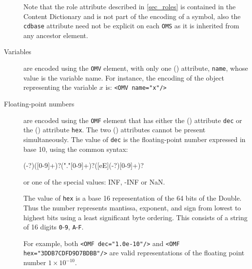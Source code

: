 \begin{description}
  Note that the role attribute described in \ref{sec_roles} is contained in the Content
  Dictionary and is not part of the encoding of a symbol, also the \lstinline|cdbase|
  attribute need not be explicit on each \lstinline|OMS| as it is inherited from any
  ancestor element.
\item[Variables] are encoded using the \lstinline|OMV| element, with only one (\XML)
  attribute, \lstinline|name|, whose value is the variable name. For instance, the
  encoding of the object representing the variable $x$ is: \lstinline|<OMV name="x"/>|
\item[Floating-point numbers] are encoded using the \lstinline|OMF| element that has
  either the (\XML) attribute \lstinline|dec| or the (\XML) attribute \lstinline|hex|. The
  two (\XML) attributes cannot be present simultaneously. The value of \lstinline|dec| is
  the floating-point number expressed in base 10, using the common syntax:

\begin{lstinline}
(-?)([0-9]+)?("."[0-9]+)?([eE](-?)[0-9]+)?
\end{lstinline}

or one of the special values: INF, -INF or NaN.

The value of \lstinline|hex| is a base 16 representation of the 64 bits of the
 Double.  Thus the number represents mantissa, exponent, and sign from
lowest to highest bits using a least significant byte ordering.  This consists of a string
of 16 digits \lstinline|0|-\lstinline|9|, \lstinline|A|-\lstinline|F|.
  

For example, both \lstinline|<OMF dec="1.0e-10"/>| and 
\lstinline|<OMF hex="3DDB7CDFD9D7BDBB"/>|
are valid representations of the floating point number $1\times 10^{-10}$.
 

\end{description}

